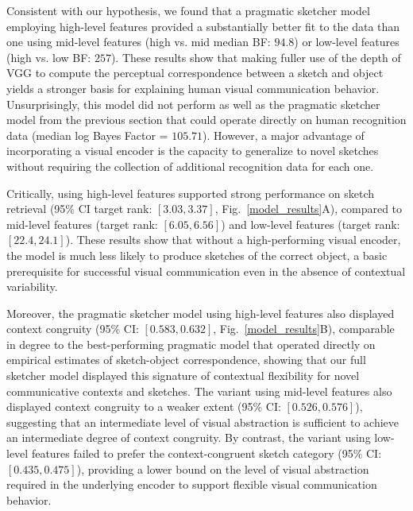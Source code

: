 \documentclass[9pt,twocolumn,twoside]{pnas-new}
\begin{document}

Consistent with our hypothesis, we found that a pragmatic sketcher model employing high-level features provided a substantially better fit to the data than one using mid-level features (high vs. mid median BF: $94.8$) or low-level features (high vs. low BF: $257$).
These results show that making fuller use of the depth of VGG to compute the perceptual correspondence between a sketch and object yields a stronger basis for explaining human visual communication behavior.
Unsurprisingly, this model did not perform as well as the pragmatic sketcher model from the previous section that could operate directly on human recognition data (median log Bayes Factor = $105.71$).
However, a major advantage of incorporating a visual encoder is the capacity to generalize to novel sketches without requiring the collection of additional recognition data for each one.

Critically, using high-level features supported strong performance on sketch retrieval (95\% CI target rank: $[3.03, 3.37]$, Fig.~\ref{model_results}A), compared to mid-level features (target rank: $[6.05, 6.56]$) and low-level features (target rank: $[22.4, 24.1]$). 
These results show that without a high-performing visual encoder, the model is much less likely to produce sketches of the correct object, a basic prerequisite for successful visual communication even in the absence of contextual variability. 

Moreover, the pragmatic sketcher model using high-level features also displayed context congruity (95\% CI: $[0.583, 0.632]$, Fig.~\ref{model_results}B), comparable in degree to the best-performing pragmatic model that operated directly on empirical estimates of sketch-object correspondence, showing that our full sketcher model displayed this signature of contextual flexibility for novel communicative contexts and sketches. 
The variant using mid-level features also displayed context congruity to a weaker extent (95\% CI: $[0.526, 0.576]$), suggesting that an intermediate level of visual abstraction is sufficient to achieve an intermediate degree of context congruity. 
By contrast, the variant using low-level features failed to prefer the context-congruent sketch category (95\% CI: $[0.435, 0.475]$), providing a lower bound on the level of visual abstraction required in the underlying encoder to support flexible visual communication behavior. 
\end{document}
